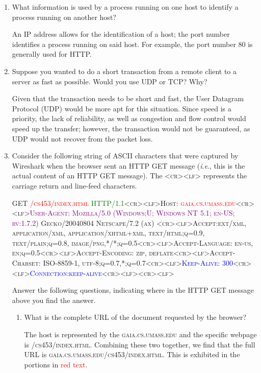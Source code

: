 \begin{enumerate}
  \item What information is used by a process running on one host to identify a process running on another host?

    An IP address allows for the identification of a host; the port number identifies a process running on said host. For example, the port number 80 is generally used for HTTP.
    
  \item Suppose you wanted to do a short transaction from a remote client to a server as fast as possible. Would you use UDP or TCP? Why?

    Given that the transaction needs to be short and fast, the User Datagram Protocol (UDP) would be more apt for this situation. Since speed is a priority, the lack of reliability, as well as congestion and flow control would speed up the transfer; however, the transaction would not be guaranteed, as UDP would not recover from the packet loss.
    
  \item Consider the following string of ASCII characters that were captured by Wireshark when the browser sent an HTTP GET message (\textit{i}.\textit{e}., this is the actual content of an HTTP GET message). The \textsc{<cr><lf>} represents the carriage return and line-feed characters.

    \begin{flushleft}
      \textsc{GET \textcolor{red}{/cs453/index.html} \textcolor{green}{HTTP/1.1}<cr><lf>Host: \textcolor{red}{gaia.cs.umass.edu}<cr><lf>\textcolor{purple}{User-Agent: Mozilla/5.0 (Windows;U; Windows NT 5.1; en-US; rv:1.7.2)} Gecko/20040804 Netscape/7.2 (ax) <cr><lf>Accept:ext/xml, application/xml, application/xhtml+xml, text/html;q=0.9, text/plain;q=0.8, image/png,*/*;q=0.5<cr><lf>Accept-Language: en-us, en;q=0.5<cr><lf>Accept-Encoding: zip, deflate<cr><lf>Accept-Charset: ISO-8859-1, utf-8;q=0.7,*;q=0.7<cr><lf>\textcolor{blue}{Keep-Alive: 300}<cr><lf>\textcolor{blue}{Connection:keep-alive}<cr><lf><cr><lf>}
    \end{flushleft}

    Answer the following questions, indicating where in the HTTP GET message above you find the answer.

    \begin{enumerate}

      \item What is the complete URL of the document requested by the browser?

        The host is represented by the \textsc{gaia.cs.umass.edu} and the specific webpage is \textsc{/cs453/index.html}. Combining these two together, we find that the full URL is \textsc{gaia.cs.umass.edu/cs453/index.html}. This is exhibited in the portions in \textcolor{red}{red text}.


\end{enumerate}
\end{enumerate}
